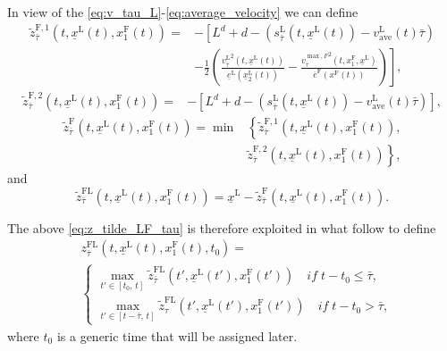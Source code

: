 \documentclass[letterpaper, 10 pt, conference]{ieeeconf}
\theoremstyle{definition}
\theoremstyle{nopoint}
\begin{document}
In view of the \eqref{eq:v_tau_L}\--\eqref{eq:average_velocity} we can define 
\begin{equation*}\label{eq:z_tilde_prime}
\begin{aligned}
\tilde{z}^{\mathrm{F},1}_{\bar{\tau}} (t,\underline{x}^\mathrm{L}(t),x_1^\mathrm{F}(t))=& -\left[L^d +d -\left(s_{\bar{\tau}}^\mathrm{L}(t,\underline{x}^\mathrm{L}(t))-v_{\mathrm{ave}}^\mathrm{L}(t)\bar{\tau}\right)\right. \\
& \left. -\frac{1}{2}\left(\frac{{v_{\bar{\tau}}^\mathrm{L}}^2(t,\underline{x}^\mathrm{L}(t))}{\underline{e}^\mathrm{L}(\underline{x}_2^\mathrm{L}(t))}-\frac{{v_{\bar{\tau}}^{\max, F}}^2\left( t,x_1^\mathrm{F},\underline{x}^\mathrm{L} \right)}{\overline{e}^\mathrm{F}(x^\mathrm{F}(t))}\right)\right],
\end{aligned}
\end{equation*}
\begin{equation*}\label{eq:z_tilde_second}
\begin{aligned}
\tilde{z}^{\mathrm{F},2}_{\bar{\tau}} (t,\underline{x}^\mathrm{L}(t),x_1^\mathrm{F}(t))=& -\left[L^d +d -\left(s_{\bar{\tau}}^\mathrm{L}(t,\underline{x}^\mathrm{L}(t))-v_{\mathrm{ave}}^\mathrm{L}(t)\bar{\tau}\right)\right],
\end{aligned}
\end{equation*}
\begin{equation}\label{eq:z_tilde}
\begin{aligned}
\tilde{z}^{\mathrm{F}}_{\bar{\tau}} (t,\underline{x}^\mathrm{L}(t),x_1^\mathrm{F}(t))=\min & \left\{ \tilde{z}^{\mathrm{F},1}_{\bar{\tau}} (t,\underline{x}^\mathrm{L}(t),x_1^\mathrm{F}(t)),\right. \\
& \left. \tilde{z}^{\mathrm{F},2}_{\bar{\tau}} (t,\underline{x}^\mathrm{L}(t),x_1^\mathrm{F}(t)) \right\},
\end{aligned}
\end{equation}
and
\begin{equation}\label{eq:z_tilde_LF_tau}
\tilde{z}^{\mathrm{FL}}_{\bar{\tau}} (t,\underline{x}^\mathrm{L}(t),x_1^\mathrm{F}(t))=\underline{x}^\mathrm{L}-\tilde{z}^{\mathrm{F}}_{\bar{\tau}} (t,\underline{x}^\mathrm{L}(t),x_1^\mathrm{F}(t)). 
\end{equation} 
 
The above \eqref{eq:z_tilde_LF_tau} is therefore exploited in  what follow to define
\begin{equation}\label{eq:z_LF_tau}
\begin{aligned}
& z^{\mathrm{FL}}_{\bar{\tau}} (t,\underline{x}^\mathrm{L}(t),x_1^\mathrm{F}(t),t_0)= \\
& \begin{cases}
\max_{t' \in [t_0,\, t]} \tilde{z}^{\mathrm{FL}}_{\bar{\tau}} (t',\underline{x}^\mathrm{L}(t'),x_1^\mathrm{F}(t'))\quad \mathit{if }\; t-t_0\leq \bar{\tau}, \\
\max_{t' \in [t-\bar{\tau},\, t]} \tilde{z}^{\mathrm{FL}}_\tau (t',\underline{x}^\mathrm{L}(t'),x_1^\mathrm{F}(t'))\quad \mathit{if }\; t-t_0> \bar{\tau},
\end{cases}
\end{aligned}
\end{equation}
where $t_0$ is a generic time that will be assigned later.  
\end{document}

